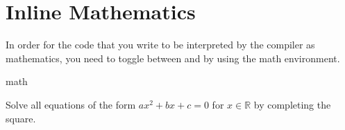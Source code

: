 \section{Inline Mathematics}
 In order for the code
that you write to be interpreted by the compiler as mathematics, you need
to toggle between  and  by using the
math environment.
\begin{docEnvironment*}[doclang/environment content=mathematics content goes here]{math}{}{}
\begin{dispExample}
Solve all equations of the form 
\begin{math} 
  ax^2 + bx + c = 0 
\end{math}
for 
\begin{math} 
  x \in \mathbb{R} 
\end{math} 
by completing the square.
\end{dispExample}


\end{docEnvironment*}
